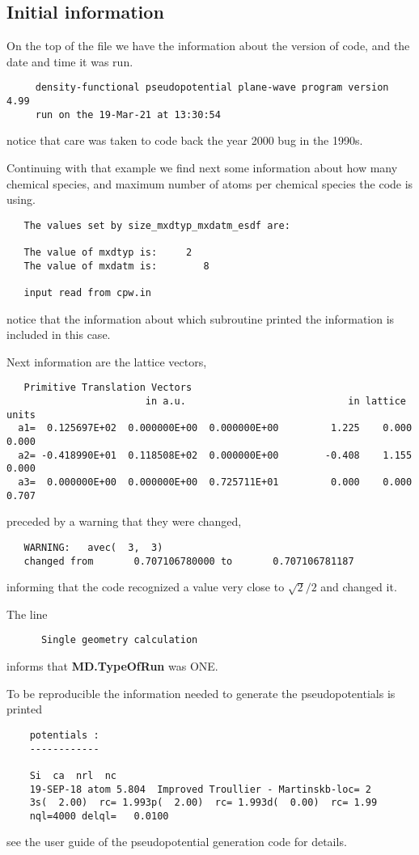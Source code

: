 \documentclass[11pt]{article}
\begin{document}
\subsection{Initial information}

On the top of the file we have the information about the version of code, and the date
and time it was run.
\begin{verbatim}
     density-functional pseudopotential plane-wave program version 4.99
     run on the 19-Mar-21 at 13:30:54
\end{verbatim}
notice that care was taken to code back the year 2000 bug in the 1990s.

Continuing with that example we find next some information about how many chemical species,
and maximum number of atoms per chemical species the code is using.
\begin{verbatim}
   The values set by size_mxdtyp_mxdatm_esdf are:

   The value of mxdtyp is:     2
   The value of mxdatm is:        8

   input read from cpw.in
\end{verbatim}
notice that the information about which subroutine printed the
information is included in this case.

Next information are the lattice vectors,
\begin{verbatim}
   Primitive Translation Vectors
                        in a.u.                            in lattice units
  a1=  0.125697E+02  0.000000E+00  0.000000E+00         1.225    0.000    0.000
  a2= -0.418990E+01  0.118508E+02  0.000000E+00        -0.408    1.155    0.000
  a3=  0.000000E+00  0.000000E+00  0.725711E+01         0.000    0.000    0.707
\end{verbatim}
preceded by a warning that they were changed,
\begin{verbatim}
   WARNING:   avec(  3,  3)
   changed from       0.707106780000 to       0.707106781187
\end{verbatim}
informing that the code recognized a value very close to $\sqrt{2}/2$ and
changed it.

The line
\begin{verbatim}
      Single geometry calculation
\end{verbatim}
informs that {\bf MD.TypeOfRun} was {ONE}.

To be reproducible the information needed to generate the pseudopotentials
is printed
\begin{verbatim}
    potentials :
    ------------

    Si  ca  nrl  nc
    19-SEP-18 atom 5.804  Improved Troullier - Martinskb-loc= 2
    3s(  2.00)  rc= 1.993p(  2.00)  rc= 1.993d(  0.00)  rc= 1.99
    nql=4000 delql=   0.0100
\end{verbatim}
see the user guide of the pseudopotential generation code for details.
\end{document}

